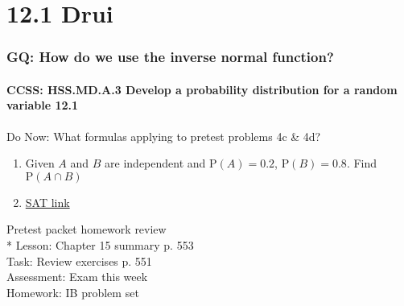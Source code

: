 \documentclass{beamer}
\begin{document}
  \section{12.1 Drui}
  \frame
  {
    \frametitle{GQ: How do we use the inverse normal function?}
    \framesubtitle{CCSS: HSS.MD.A.3 Develop a probability distribution for a random variable \qquad \alert{12.1}}

    \begin{block}{Do Now: What formulas applying to pretest problems 4c \& 4d?}
      \begin{enumerate}
      \item Given $A$ and $B$ are independent and $\mathrm{P}(A)=0.2$, $\mathrm{P}(B)=0.8$. Find $\mathrm{P}(A \cap B)$
      \item \href{https://blog.prepscholar.com/sat-standard-deviation}{SAT link}
      \end{enumerate}
   \end{block}
    Pretest packet homework review\\*
    Lesson: Chapter 15 summary p. 553\\%
    Task: Review exercises p. 551\\%
    Assessment: Exam this week\\%
    Homework: IB problem set
  }
\end{document}
